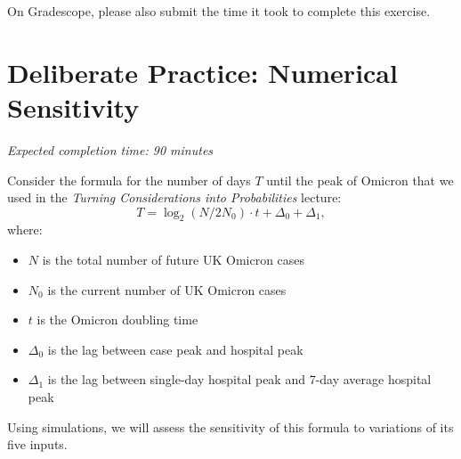 \documentclass[11pt]{article}
\begin{document}
On Gradescope, please also submit the time it took to complete this exercise.

\newpage

\section*{Deliberate Practice: Numerical Sensitivity}

\emph{Expected completion time: 90 minutes}

Consider the formula for the number of days $T$ until the peak of Omicron that we used in the \emph{Turning Considerations into Probabilities} lecture:
$$T = \log_2(N / 2 N_0) \cdot t + \Delta_0 + \Delta_1,$$
where:
\begin{itemize}
	\item $N$ is the total number of future UK Omicron cases
	\item $N_0$ is the current number of UK Omicron cases
	\item $t$ is the Omicron doubling time
	\item $\Delta_0$ is the lag between case peak and hospital peak
	\item $\Delta_1$ is the lag between single-day hospital peak and 7-day average hospital peak
\end{itemize}

Using simulations, we will assess the sensitivity of this formula to variations of its five inputs.
\end{document}
